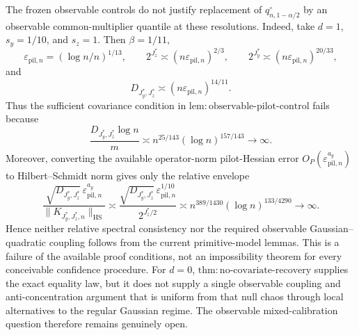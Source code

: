 The frozen observable controls do not justify replacement of
\(q_{n,1-\alpha/2}^\circ\) by an observable common-multiplier quantile at these resolutions.  Indeed, take
\(d=1\), \(s_y=1/10\), and \(s_z=1\).  Then \(\beta=1/11\),
\[
\varepsilon_{\mathrm{pil},n}=(\log n/n)^{1/13},
\qquad
2^{J_z^*}\asymp(n\varepsilon_{\mathrm{pil},n})^{2/3},
\qquad
2^{J_y^*}\asymp(n\varepsilon_{\mathrm{pil},n})^{20/33},
\]
and
\[
D_{J_y^*,J_z^*}\asymp(n\varepsilon_{\mathrm{pil},n})^{14/11}.
\]
Thus the sufficient covariance condition in \(\mathrm{lem{:}observable\text{-}pilot\text{-}control}\) fails because
\[
\frac{D_{J_y^*,J_z^*}\log n}{m}
\asymp n^{25/143}(\log n)^{157/143}\longrightarrow\infty.
\]
Moreover, converting the available operator-norm pilot-Hessian error
\(O_P(\varepsilon_{\mathrm{pil},n}^{a_y})\) to Hilbert--Schmidt norm gives only the relative envelope
\[
\frac{\sqrt{D_{J_y^*,J_z^*}}\,
\varepsilon_{\mathrm{pil},n}^{a_y}}
{\|K_{J_y^*,J_z^*,n}\|_{\mathrm{HS}}}
\asymp
\frac{\sqrt{D_{J_y^*,J_z^*}}\,
\varepsilon_{\mathrm{pil},n}^{1/10}}
{2^{J_z^*/2}}
\asymp
n^{389/1430}(\log n)^{133/4290}\longrightarrow\infty.
\]
Hence neither relative spectral consistency nor the required observable Gaussian--quadratic coupling follows from the current primitive-model lemmas.  This is a failure of the available proof conditions, not an impossibility theorem for every conceivable confidence procedure.  For \(d=0\), \(\mathrm{thm{:}no\text{-}covariate\text{-}recovery}\) supplies the exact equality law, but it does not supply a single observable coupling and anti-concentration argument that is uniform from that null chaos through local alternatives to the regular Gaussian regime.  The observable mixed-calibration question therefore remains genuinely open.